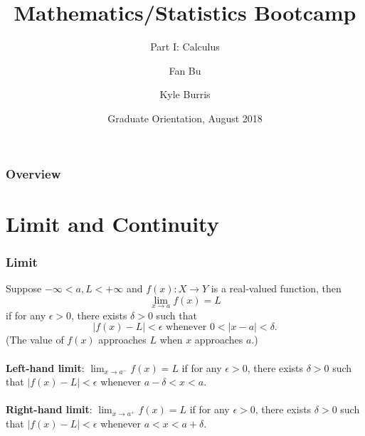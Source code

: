 \documentclass{beamer}
\title[Calculus]{Mathematics/Statistics Bootcamp} %
\subtitle{Part I: Calculus}
\author{Fan Bu\inst{1} \and Kyle Burris\inst{1}}
\institute[Duke University] %
{
  \inst{1}%
  Department of Statistical Science\\
  Duke University
  }
\date{Graduate Orientation, August 2018}
\begin{document}
\begin{frame}
\titlepage %
\end{frame}

\begin{frame}
\frametitle{Overview} %
\tableofcontents %
\end{frame}


\section{Limit and Continuity} %


\begin{frame}
\frametitle{Limit}
Suppose $-\infty < a,L < +\infty$ and $f(x): X \rightarrow Y$ is a real-valued function, then 
$$
\lim_{x\rightarrow a}f(x) = L
$$
if for any $\epsilon > 0$, there exists $\delta > 0$ such that \\
$$
\vert f(x)-L \vert < \epsilon \text{ whenever } 
0 < \vert x-a \vert < \delta.
$$
(The value of $f(x)$ approaches $L$ when $x$ approaches $a$.)
\\~\\
\textbf{Left-hand limit}:
$\lim_{x\rightarrow a^{-}}f(x) = L$ if for any $\epsilon > 0$, there exists $\delta > 0$ such that
$\vert f(x)-L \vert < \epsilon$ whenever
$ a-\delta < x < a$.
\\~\\
\textbf{Right-hand limit}:
$\lim_{x\rightarrow a^{+}}f(x) = L$ if for any $\epsilon > 0$, there exists $\delta > 0$ such that
$\vert f(x)-L \vert < \epsilon$ whenever
$ a < x < a+\delta$.

 \end{frame}
\end{document}
